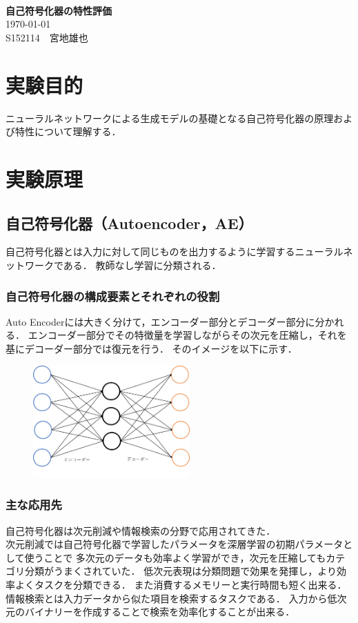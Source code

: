 \documentclass[12pt]{jsarticle}
\newcommand{\frontpage}[3]{
\begin{center}
　\\
\vspace{15em}{\LARGE{}レポート課題}\\
　\\
{\Huge\bf#1}\\
\vspace{30em}
{\LARGE\today}\\
\vspace{2em}
{\LARGE#2　#3}
\end{center}
\thispagestyle{empty}
\clearpage
\setcounter{page}{1}
}
\begin{document}
\frontpage
{自己符号化器の特性評価}
{S152114}
{宮地雄也}

\section{実験目的}

ニューラルネットワークによる生成モデルの基礎となる自己符号化器の原理および特性について理解する．

\section{実験原理}

\subsection{自己符号化器（Autoencoder，AE）}
自己符号化器とは入力に対して同じものを出力するように学習するニューラルネットワークである．
教師なし学習に分類される．


\subsubsection{自己符号化器の構成要素とそれぞれの役割}
Auto Encoderには大きく分けて，エンコーダー部分とデコーダー部分に分かれる．
エンコーダー部分でその特徴量を学習しながらその次元を圧縮し，それを基にデコーダー部分では復元を行う．
そのイメージを以下に示す．
\begin{figure}[ht]
  \begin{center}
    \includegraphics[width = 6cm]{AE_image.png}
  \end{center}
\end{figure}


\subsubsection{主な応用先}
自己符号化器は次元削減や情報検索の分野で応用されてきた．\\
次元削減では自己符号化器で学習したパラメータを深層学習の初期パラメータとして使うことで
多次元のデータも効率よく学習ができ，次元を圧縮してもカテゴリ分類がうまくされていた．
低次元表現は分類問題で効果を発揮し，より効率よくタスクを分類できる．
また消費するメモリーと実行時間も短く出来る．
\\
情報検索とは入力データから似た項目を検索するタスクである．
入力から低次元のバイナリーを作成することで検索を効率化することが出来る．
\end{document}
